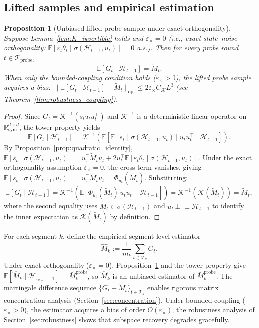 \documentclass[12pt]{article}
\newcommand{\E}{\mathbb{E}}
\newcommand{\op}{\mathrm{op}}
\newcommand{\cH}{\mathcal{H}}
\newcommand{\cT}{\mathcal{T}}
\newcommand{\cTprobe}{\mathcal{T}_{\mathrm{probe}}}
\newcommand{\Rsy}{\mathbb{R}^{d\times d}_{\mathrm{sym}}}
\newtheorem{proposition}{Proposition}
\theoremstyle{plain}
\theoremstyle{definition}
\begin{document}
\subsection{Lifted samples and empirical estimation}

\begin{proposition}[Unbiased lifted probe sample under exact orthogonality]
\label{prop:lifted_probe_unbiased}
Suppose Lemma~\ref{lem:K_invertible} holds and $\varepsilon_\times = 0$ (i.e., exact state--noise orthogonality: $\E[\varepsilon_t \theta_t \mid \sigma(\cH_{t-1}, u_t)] = 0$ a.s.). Then for every probe round $t \in \cTprobe$,
\begin{equation}
\E[G_t \mid \cH_{t-1}] = \widetilde{M}_t.
\label{eq:Gt_unbiased}
\end{equation}
When only the bounded-coupling condition holds ($\varepsilon_\times > 0$), the lifted probe sample acquires a bias: $\|\E[G_t \mid \cH_{t-1}] - \widetilde{M}_t\|_{\op} \le 2\varepsilon_\times C_{\mathcal{K}} L^3$ (see Theorem~\ref{thm:robustness_coupling}).
\end{proposition}

\begin{proof}
Since $G_t = \mathcal{K}^{-1}(s_t u_t u_t^\top)$ and $\mathcal{K}^{-1}$ is a deterministic linear operator on $\Rsy$, the tower property yields
\[
\E[G_t \mid \cH_{t-1}]
= \mathcal{K}^{-1}\!\left(\E\!\left[\E[s_t \mid \sigma(\cH_{t-1}, u_t)]\, u_t u_t^\top \mid \cH_{t-1}\right]\right).
\]
By Proposition~\ref{prop:quadratic_identity}, $\E[s_t \mid \sigma(\cH_{t-1}, u_t)] = u_t^\top \widetilde{M}_t u_t + 2u_t^\top \E[\varepsilon_t \theta_t \mid \sigma(\cH_{t-1}, u_t)]$. Under the exact orthogonality assumption $\varepsilon_\times = 0$, the cross term vanishes, giving $\E[s_t \mid \sigma(\cH_{t-1}, u_t)] = u_t^\top \widetilde{M}_t u_t = \Phi_{u_t}(\widetilde{M}_t)$. Substituting:
\[
\E[G_t \mid \cH_{t-1}]
= \mathcal{K}^{-1}\!\left(\E\!\left[\Phi_{u_t}(\widetilde{M}_t)\, u_t u_t^\top \mid \cH_{t-1}\right]\right)
= \mathcal{K}^{-1}(\mathcal{K}(\widetilde{M}_t))
= \widetilde{M}_t,
\]
where the second equality uses $\widetilde{M}_t \in \sigma(\cH_{t-1})$ and $u_t \perp\!\!\!\perp \cH_{t-1}$ to identify the inner expectation as $\mathcal{K}(\widetilde{M}_t)$ by definition.
\end{proof}

For each segment $k$, define the empirical segment-level estimator
\begin{equation}
\widehat{M}_k := \frac{1}{m_k} \sum_{t \in \cT_k} G_t.
\label{eq:Mhat_k}
\end{equation}
Under exact orthogonality ($\varepsilon_\times = 0$), Proposition~\ref{prop:lifted_probe_unbiased} and the tower property give $\E[\widehat{M}_k \mid \cH_{\tau_{k-1}-1}] = \bar{M}_k^{\mathrm{probe}}$, so $\widehat{M}_k$ is an unbiased estimator of $\bar{M}_k^{\mathrm{probe}}$. The martingale difference sequence $\{G_t - \widetilde{M}_t\}_{t \in \cT_k}$ enables rigorous matrix concentration analysis (Section~\ref{sec:concentration}). Under bounded coupling ($\varepsilon_\times > 0$), the estimator acquires a bias of order $O(\varepsilon_\times)$; the robustness analysis of Section~\ref{sec:robustness} shows that subspace recovery degrades gracefully.
\end{document}
